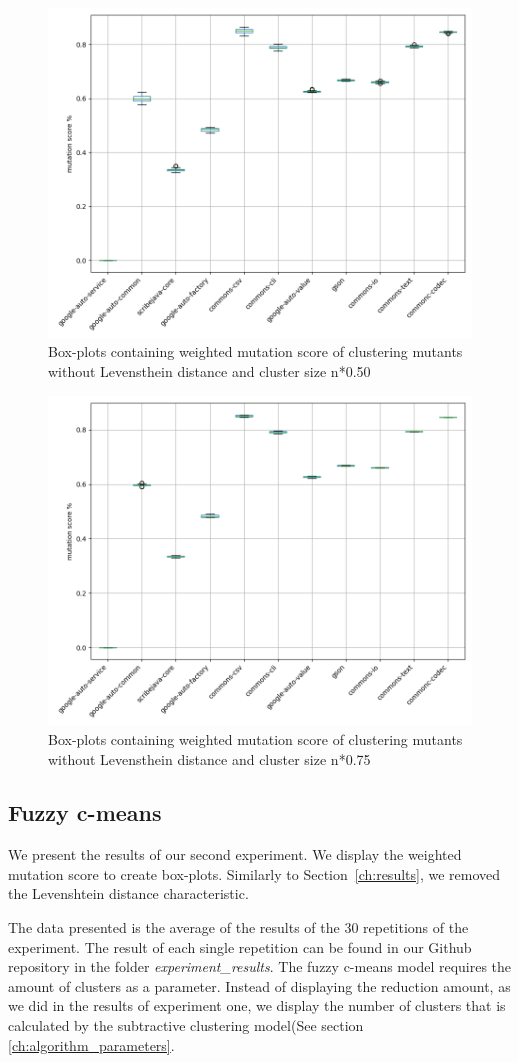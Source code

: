 \documentclass[conference,draftclsnofoot,onecolumn]{IEEEtran}
\begin{document}
\begin{figure}[ht]
\includegraphics[width=0.5 \textwidth]{images/boxplot_summary/boxplot_hc_no_distance_0.5.png}
\caption{\label{box:clustering_no_distance_50}Box-plots containing weighted mutation score of clustering mutants without Levensthein distance and cluster size n*0.50}
\end{figure}

\begin{figure}[ht]
\includegraphics[width=0.5 \textwidth]{images/boxplot_summary/boxplot_hc_no_distance_0.75.png}
\caption{\label{box:clustering_no_distance_75}Box-plots containing weighted mutation score of clustering mutants without Levensthein distance and cluster size n*0.75}
\end{figure}

\subsection{Fuzzy c-means}
\label{ch:results_rq2}
We present the results of our second experiment.
We display the weighted mutation score to create box-plots.
Similarly to Section~\ref{ch:results}, we removed the Levenshtein distance characteristic.

The data presented is the average of the results of the 30 repetitions of the experiment.
The result of each single repetition can be found in our Github repository in the folder \textit{experiment{\_}results}\cite{rbasarat-repo}.
The fuzzy c-means model requires the amount of clusters as a parameter.
Instead of displaying the reduction amount, as we did in the results of experiment one, we display the number of clusters that is calculated by the subtractive clustering model(See section \ref{ch:algorithm_parameters}.
\end{document}
